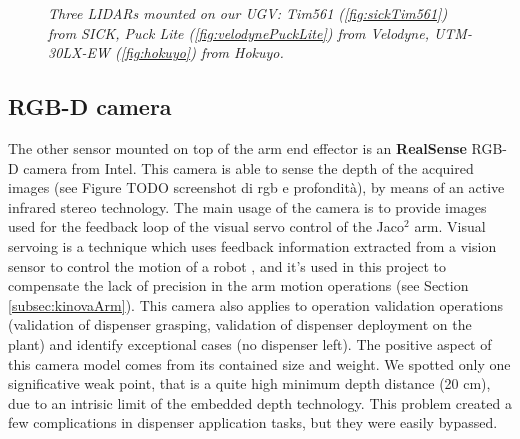 \begin{figure}
	\centering
	\caption{\textit{Three \ac{LIDAR}s mounted on our \ac{UGV}: Tim561 (\ref{fig:sickTim561}) from SICK, Puck Lite (\ref{fig:velodynePuckLite}) from Velodyne, UTM-30LX-EW (\ref{fig:hokuyo}) from Hokuyo.}}
\end{figure}

\subsection{RGB-D camera}
The other sensor mounted on top of the arm end effector is an \textbf{RealSense} RGB-D camera from Intel. This camera is able to sense the depth of the acquired images (see Figure TODO screenshot di rgb e profondità), by means of an active infrared stereo technology. The main usage of the camera is to provide images used for the feedback loop of the visual servo control of the Jaco$^2$ arm. Visual servoing is a technique which uses feedback information extracted from a vision sensor to control the motion of a robot \parencite{visualServo}, and it's used in this project to compensate the lack of precision in the arm motion operations (see Section \ref{subsec:kinovaArm}). This camera also applies to operation validation operations (validation of dispenser grasping, validation of dispenser deployment on the plant) and identify exceptional cases (no dispenser left). The positive aspect of this camera model comes from its contained size and weight. We spotted only one significative weak point, that is a quite high minimum depth distance (20 cm), due to an intrisic limit of the embedded depth technology. This problem created a few complications in dispenser application tasks, but they were easily bypassed.

